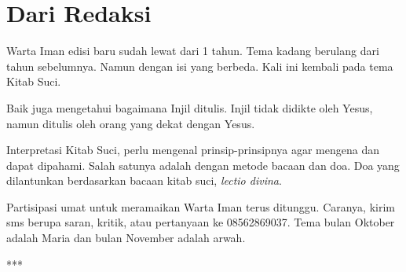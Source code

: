 \newpage

\chapter*{Dari Redaksi}

Warta Iman edisi baru sudah lewat dari 1 tahun. Tema kadang berulang dari tahun sebelumnya. Namun dengan isi yang berbeda. Kali ini kembali pada tema Kitab Suci.

\bigskip
Baik juga mengetahui bagaimana Injil ditulis. Injil tidak didikte oleh Yesus, namun ditulis oleh orang yang dekat dengan Yesus. 
  
\bigskip
Interpretasi Kitab Suci, perlu mengenal prinsip-prinsipnya agar mengena dan dapat dipahami. Salah satunya adalah dengan metode bacaan dan doa. Doa yang dilantunkan berdasarkan bacaan kitab suci, \textit{lectio divina}.

\bigskip
Partisipasi umat untuk meramaikan Warta Iman terus ditunggu. Caranya, kirim sms berupa saran, kritik, atau pertanyaan ke 08562869037. Tema bulan Oktober adalah Maria dan bulan November adalah arwah. 
\normalsize

\begin{center}***\end{center} 

\vfill

\footnotesize
{}
\normalsize

